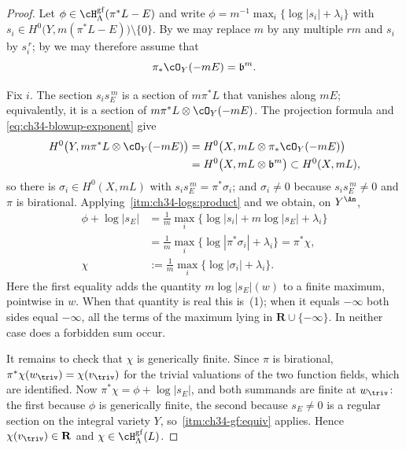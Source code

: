 \begin{proof}
Let $\phi\in\cH^{\mathrm{gf}}_\Lambda(\pi^*L-E)$ and write
$\phi=m^{-1}\max_i\{\log|s_i|+\lambda_i\}$ with
$s_i\in H^0\bigl(Y,m(\pi^*L-E)\bigr)\setminus\{0\}$.  By
 we may replace $m$ by any multiple $rm$ and
$s_i$ by $s_i^{\,r}$; by  we may
therefore assume that
\begin{equation}
\label{eq:ch34-blowup-exponent}
 \pi_*\cO_Y(-mE)=\mathfrak b^m .
\end{equation}

Fix $i$.  The section $s_is_E^{\,m}$ is a section of $m\pi^*L$ that
vanishes along $mE$; equivalently, it is a section of
$m\pi^*L\otimes\cO_Y(-mE)$.  The projection formula and
\eqref{eq:ch34-blowup-exponent} give
\[
 \begin{aligned}
 H^0\bigl(Y,m\pi^*L\otimes\cO_Y(-mE)\bigr)
 &=H^0\bigl(X,mL\otimes\pi_*\cO_Y(-mE)\bigr)\\
 &=H^0\bigl(X,mL\otimes\mathfrak b^m\bigr)
  \subset H^0(X,mL),
 \end{aligned}
\]
so there is $\sigma_i\in H^0(X,mL)$ with
$s_is_E^{\,m}=\pi^*\sigma_i$; and $\sigma_i\ne0$ because
$s_is_E^{\,m}\ne0$ and $\pi$ is birational.  Applying
\,\cref{itm:ch34-logs:product} and
 we obtain, on $Y^{\An}$,
\[
 \begin{aligned}
 \phi+\log|s_E|
 &=\frac1m\max_i\bigl\{\log|s_i|+m\log|s_E|+\lambda_i\bigr\}\\
 &=\frac1m\max_i\bigl\{\log|\pi^*\sigma_i|+\lambda_i\bigr\}
 =\pi^*\chi,\\
 \chi&:=\frac1m\max_i\bigl\{\log|\sigma_i|+\lambda_i\bigr\}.
 \end{aligned}
\]
Here the first equality adds the quantity $m\log|s_E|(w)$ to a finite
maximum, pointwise in $w$.  When that quantity is real this is
\,(1); when it equals $-\infty$ both sides
equal $-\infty$, all the terms of the maximum lying in
$\mathbf R\cup\{-\infty\}$.  In neither case does a forbidden sum occur.

It remains to check that $\chi$ is generically finite.  Since $\pi$ is
birational, $\pi^*\chi(w_{\triv})=\chi(v_{\triv})$ for the trivial
valuations of the two function fields, which are identified.  Now
$\pi^*\chi=\phi+\log|s_E|$, and both summands are finite at $w_{\triv}$:
the first because $\phi$ is generically finite, the second because
$s_E\ne0$ is a regular section on the integral variety $Y$, so
\,\cref{itm:ch34-gf:equiv} applies.  Hence
$\chi(v_{\triv})\in\mathbf R$ and
$\chi\in\cH^{\mathrm{gf}}_\Lambda(L)$.
\end{proof}


